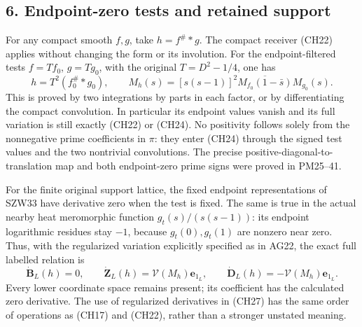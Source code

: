\documentclass[
  10pt,
  a4paper,
]{article}
\begin{document}
\subsection{6. Endpoint-zero tests and retained
support}\label{endpoint-zero-tests-and-retained-support}

For any compact smooth \(f,g\), take \(h=f^\#*g\). The compact receiver
(CH22) applies without changing the form or its involution. For the
endpoint-filtered tests \(f=T f_0\), \(g=Tg_0\), with the original
\(T=D^2-1/4\), one has \[
h=T^2(f_0^\#*g_0),\qquad
M_h(s)=[s(s-1)]^2\overline{M_{f_0}(1-\bar s)}M_{g_0}(s).
\tag{CH26}
\] This is proved by two integrations by parts in each factor, or by
differentiating the compact convolution. In particular its endpoint
values vanish and its full variation is still exactly (CH22) or (CH24).
No positivity follows solely from the nonnegative prime coefficients in
\(\pi\): they enter (CH24) through the signed test values and the two
nontrivial convolutions. The precise positive-diagonal-to-translation
map and both endpoint-zero prime signs were proved in PM25--41.

For the finite original support lattice, the fixed endpoint
representations of SZW33 have derivative zero when the test is fixed.
The same is true in the actual nearby heat meromorphic function
\(g_t(s)/(s(s-1))\): its endpoint logarithmic residues stay \(-1\),
because \(g_t(0),g_t(1)\) are nonzero near zero. Thus, with the
regularized variation explicitly specified as in AG22, the exact full
labelled relation is \[
\dot{\boldsymbol B}_L(h)=0,\qquad
\dot{\boldsymbol Z}_L(h)=\mathcal V(M_h)\mathbf e_{1_L},\qquad
\dot{\boldsymbol D}_L(h)=-\mathcal V(M_h)\mathbf e_{1_L}.
\tag{CH27}
\] Every lower coordinate space remains present; its coefficient has the
calculated zero derivative. The use of regularized derivatives in (CH27)
has the same order of operations as (CH17) and (CH22), rather than a
stronger unstated meaning.
\end{document}
